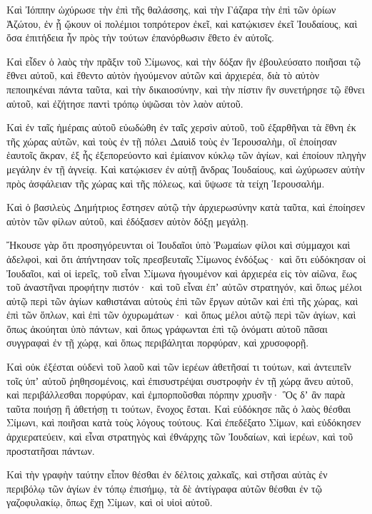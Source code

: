 {Καὶ Ἰόππην ὠχύρωσε τὴν ἐπὶ τῆς θαλάσσης, καὶ τὴν Γάζαρα τὴν ἐπὶ τῶν ὁρίων Ἀζώτου, ἐν ᾗ ᾤκουν οἱ πολέμιοι τοπρότερον ἐκεῖ, καὶ κατῴκισεν ἐκεῖ Ἰουδαίους, καὶ ὅσα ἐπιτήδεια ἦν πρὸς τὴν τούτων ἐπανόρθωσιν ἔθετο ἐν αὐτοῖς.
\par }{\PP {}Καὶ εἶδεν ὁ λαὸς τὴν πρᾶξιν τοῦ Σίμωνος, καὶ τὴν δόξαν ἣν ἐβουλεύσατο ποιῆσαι τῷ ἔθνει αὐτοῦ, καὶ ἔθεντο αὐτὸν ἡγούμενον αὐτῶν καὶ ἀρχιερέα, διὰ τὸ αὐτὸν πεποιηκέναι πάντα ταῦτα, καὶ τὴν δικαιοσύνην, καὶ τὴν πίστιν ἣν συνετήρησε τῷ ἔθνει αὐτοῦ, καὶ ἐζήτησε παντὶ τρόπῳ ὑψῶσαι τὸν λαὸν αὐτοῦ.
\par }{\PP {}Καὶ ἐν ταῖς ἡμέραις αὐτοῦ εὐωδώθη ἐν ταῖς χερσὶν αὐτοῦ, τοῦ ἐξαρθῆναι τὰ ἔθνη ἐκ τῆς χώρας αὐτῶν, καὶ τοὺς ἐν τῇ πόλει Δαυὶδ τοὺς ἐν Ἱερουσαλὴμ, οἳ ἐποίησαν ἑαυτοῖς ἄκραν, ἐξ ἧς ἐξεπορεύοντο καὶ ἐμίαινον κύκλῳ τῶν ἁγίων, καὶ ἐποίουν πληγὴν μεγάλην ἐν τῇ ἁγνείᾳ.
Καὶ κατῴκισεν ἐν αὐτῇ ἄνδρας Ἰουδαίους, καὶ ὠχύρωσεν αὐτὴν πρὸς ἀσφάλειαν τῆς χώρας καὶ τῆς πόλεως, καὶ ὕψωσε τὰ τείχη Ἱερουσαλήμ.
\par }{\PP {}Καὶ ὁ βασιλεὺς Δημήτριος ἔστησεν αὐτῷ τὴν ἀρχιερωσύνην κατὰ ταῦτα,
καὶ ἐποίησεν αὐτὸν τῶν φίλων αὐτοῦ, καὶ ἐδόξασεν αὐτὸν δόξῃ μεγάλῃ.
\par }{\PP {}Ἤκουσε γὰρ ὅτι προσηγόρευνται οἱ Ἰουδαῖοι ὑπὸ Ῥωμαίων φίλοι καὶ σύμμαχοι καὶ ἀδελφοὶ, καὶ ὅτι ἀπήντησαν τοῖς πρεσβευταῖς Σίμωνος ἐνδόξως·
καὶ ὅτι εὐδόκησαν οἱ Ἰουδαῖοι, καὶ οἱ ἱερεῖς, τοῦ εἶναι Σίμωνα ἡγουμένον καὶ ἀρχιερέα εἰς τὸν αἰῶνα, ἕως τοῦ ἀναστῆναι προφήτην πιστόν·
καὶ τοῦ εἶναι ἐπʼ αὐτῶν στρατηγόν, καὶ ὅπως μέλοι αὐτῷ περὶ τῶν ἁγίων καθιστάναι αὐτοὺς ἐπὶ τῶν ἔργων αὐτῶν καὶ ἐπὶ τῆς χώρας, καὶ ἐπὶ τῶν ὅπλων, καὶ ἐπὶ τῶν ὀχυρωμάτων·
καὶ ὅπως μέλοι αὐτῷ περὶ τῶν ἁγίων, καὶ ὅπως ἀκούηται ὑπὸ πάντων, καὶ ὅπως γράφωνται ἐπὶ τῷ ὀνόματι αὐτοῦ πᾶσαι συγγραφαὶ ἐν τῇ χώρᾳ, καὶ ὅπως περιβάληται πορφύραν, καὶ χρυσοφορῇ.
\par }{\PP {}Καὶ οὐκ ἐξέσται οὐδενὶ τοῦ λαοῦ καὶ τῶν ἱερέων ἀθετῆσαί τι τούτων, καὶ ἀντειπεῖν τοῖς ὑπʼ αὐτοῦ ῥηθησομένοις, καὶ ἐπισυστρέψαι συστροφὴν ἐν τῇ χώρᾳ ἄνευ αὐτοῦ, καὶ περιβάλλεσθαι πορφύραν, καὶ ἐμπορποῦσθαι πόρπην χρυσῆν·
Ὃς δʼ ἂν παρὰ ταῦτα ποιήσῃ ἢ ἀθετήσῃ τι τούτων, ἔνοχος ἔσται.
Καὶ εὐδόκησε πᾶς ὁ λαὸς θέσθαι Σίμωνι, καὶ ποιῆσαι κατὰ τοὺς λόγους τούτους.
Καὶ ἐπεδέξατο Σίμων, καὶ εὐδόκησεν ἀρχιερατεύειν, καὶ εἶναι στρατηγὸς καὶ ἐθνάρχης τῶν Ἰουδαίων, καὶ ἱερέων, καὶ τοῦ προστατῆσαι πάντων.
\par }{\PP {}Καὶ τὴν γραφὴν ταύτην εἶπον θέσθαι ἐν δέλτοις χαλκαῖς, καὶ στῆσαι αὐτὰς ἐν περιβόλῳ τῶν ἁγίων ἐν τόπῳ ἐπισήμῳ,
τὰ δὲ ἀντίγραφα αὐτῶν θέσθαι ἐν τῷ γαζοφυλακίῳ, ὅπως ἕχῃ Σίμων, καὶ οἱ υἱοὶ αὐτοῦ.

}
